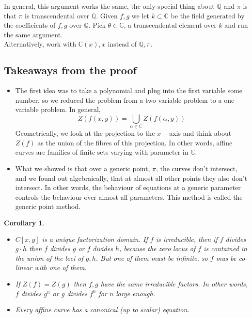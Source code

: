 \documentclass[12pt]{article}
\newtheorem{corollary}[theorem]{Corollary}
\theoremstyle{remark}
\newcommand{\Q}{\mathbb{Q}}
\newcommand{\C}{\mathbb{C}}
\begin{document}
In general, this argument works the same, the only special thing about $\Q$ and $\pi$ is that $\pi$ is transcendental over $\Q$. Given $f,g$ we let $k \subset \C$ be the field generated by the coefficients of $f,g$ over $\Q$. Pick $\theta \in \C$, a transcendental element over $k$ and run the same argument.\\

Alternatively, work with $\C(x), x$ instead of $\Q , \pi$.

\subsection{Takeaways from the proof}

\begin{itemize}
\item The first idea was to take a polynomial and plug into the first variable some number, so we reduced the problem from a two variable problem to a one variable problem. In general, 
$$Z(f(x,y)) = \bigcup_{\alpha \in \C} Z(f(\alpha,y)) $$  Geometrically, we look at the projection to the $x-$axis and think about $Z(f)$ as the union of the fibres of this projection. In other words, affine curves are families of finite sets varying with parameter in $\C$.


\item What we showed is that over a generic point, $\pi$, the curves don't intersect, and we found out algebraically, that at almost all other points they also don't intersect. In other words, the behaviour of equations at a generic parameter controls the behaviour over almost all parameters. This method is called the generic point method.


\end{itemize}


\begin{corollary}
\begin{itemize}

\item $C[x,y]$ is a unique factorization domain. If $f$ is irreducible, then if $f$ divides $g \cdot h$ then $f$ divides $g$ or $f$ divides $h$, because the zero locus of $f$ is contained in the union of the loci of $g,h$. But one of them must be infinite, so $f$ mus be co-linear with one of them.

\item If $Z(f) = Z(g)$ then $f,g$ have the same irreducible factors. In other words, $f$ divides $g^n$ or $g$ divides $f^n$ for $n$ large enough. 

\item Every affine curve has a canonical (up to scalar) equation.


\end{itemize}
\end{corollary}
\end{document}
